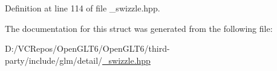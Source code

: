 Definition at line 114 of file \+\_\+swizzle.\+hpp.



The documentation for this struct was generated from the following file\+:\begin{DoxyCompactItemize}
\item 
D\+:/\+V\+C\+Repos/\+Open\+G\+L\+T6/\+Open\+G\+L\+T6/third-\/party/include/glm/detail/\mbox{\hyperlink{__swizzle_8hpp}{\+\_\+swizzle.\+hpp}}\end{DoxyCompactItemize}
